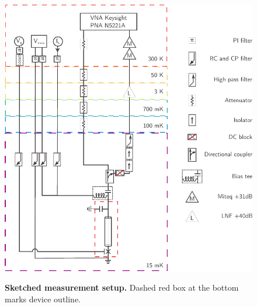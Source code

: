 \documentclass[preprint,
  onecolumn,
  notitlepage,
  amsmath,amssymb,
  aip,
  apl,
]{revtex4-1}
\begin{document}





\newpage

\begin{figure}[]
    {\centering
    \includegraphics[width=.8\linewidth]{figs/full_setup_cmyk}}
    \caption{{\bf Sketched measurement setup.}
        Dashed red box at the bottom marks device outline.
    }
    \label{fig:setup_full}
\end{figure}
\end{document}
